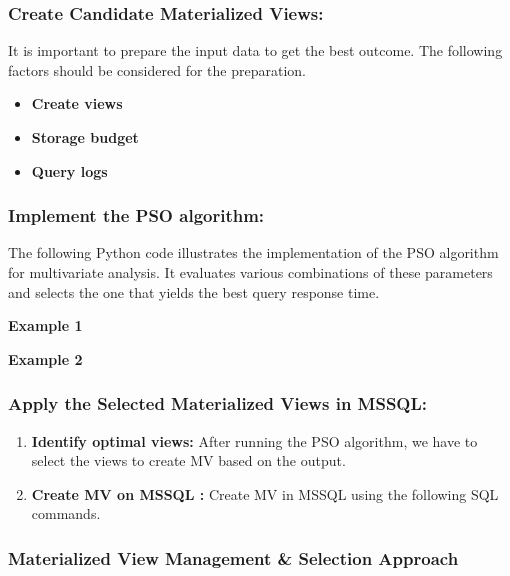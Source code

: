 \subsubsection{ Create Candidate Materialized Views:} It is important to prepare the input data to get the best outcome. The following factors should be considered for the preparation. 

  \begin{itemize}
      \item \textbf{Create views}
      \item \textbf{Storage budget}
      \item \textbf{Query logs}
  \end{itemize}

  
  
\subsubsection{Implement the PSO algorithm:}
 The following Python code illustrates the implementation of the PSO algorithm for multivariate analysis. It evaluates various combinations of these parameters and selects the one that yields the best query response time.\vspace{.4cm}

\textbf{Example 1}

  \vspace{.4cm}

\textbf{Example 2}
  \vspace{.4cm}
  
\subsubsection{Apply the Selected  Materialized Views in MSSQL:}

\begin{enumerate}
    \item \textbf{Identify optimal views:} After running the PSO algorithm, we have to select the views to create MV based on the output.
    \item \textbf{ Create MV on MSSQL :} Create MV in MSSQL using the following SQL commands.
   
    
\end{enumerate}


\subsubsection{Materialized View Management \& Selection Approach}
